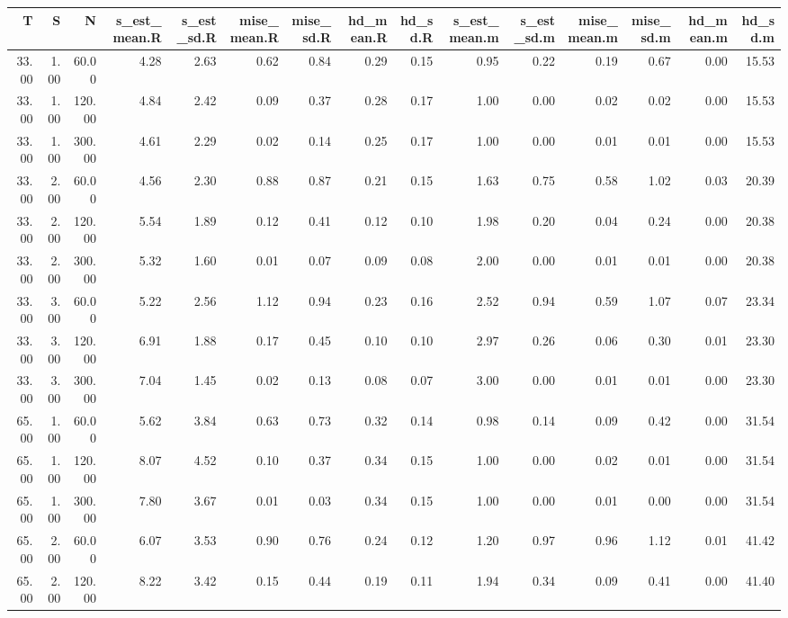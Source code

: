 \begin{table}[ht]
\centering
\begin{tabular}{rrrrrrrrrrrrrrr}
  \hline
T & S & N & s\_est\_mean.R & s\_est\_sd.R & mise\_mean.R & mise\_sd.R & hd\_mean.R & hd\_sd.R & s\_est\_mean.m & s\_est\_sd.m & mise\_mean.m & mise\_sd.m & hd\_mean.m & hd\_sd.m \\ 
  \hline
33.00 & 1.00 & 60.00 & 4.28 & 2.63 & 0.62 & 0.84 & 0.29 & 0.15 & 0.95 & 0.22 & 0.19 & 0.67 & 0.00 & 15.53 \\ 
  33.00 & 1.00 & 120.00 & 4.84 & 2.42 & 0.09 & 0.37 & 0.28 & 0.17 & 1.00 & 0.00 & 0.02 & 0.02 & 0.00 & 15.53 \\ 
  33.00 & 1.00 & 300.00 & 4.61 & 2.29 & 0.02 & 0.14 & 0.25 & 0.17 & 1.00 & 0.00 & 0.01 & 0.01 & 0.00 & 15.53 \\ 
  33.00 & 2.00 & 60.00 & 4.56 & 2.30 & 0.88 & 0.87 & 0.21 & 0.15 & 1.63 & 0.75 & 0.58 & 1.02 & 0.03 & 20.39 \\ 
  33.00 & 2.00 & 120.00 & 5.54 & 1.89 & 0.12 & 0.41 & 0.12 & 0.10 & 1.98 & 0.20 & 0.04 & 0.24 & 0.00 & 20.38 \\ 
  33.00 & 2.00 & 300.00 & 5.32 & 1.60 & 0.01 & 0.07 & 0.09 & 0.08 & 2.00 & 0.00 & 0.01 & 0.01 & 0.00 & 20.38 \\ 
  33.00 & 3.00 & 60.00 & 5.22 & 2.56 & 1.12 & 0.94 & 0.23 & 0.16 & 2.52 & 0.94 & 0.59 & 1.07 & 0.07 & 23.34 \\ 
  33.00 & 3.00 & 120.00 & 6.91 & 1.88 & 0.17 & 0.45 & 0.10 & 0.10 & 2.97 & 0.26 & 0.06 & 0.30 & 0.01 & 23.30 \\ 
  33.00 & 3.00 & 300.00 & 7.04 & 1.45 & 0.02 & 0.13 & 0.08 & 0.07 & 3.00 & 0.00 & 0.01 & 0.01 & 0.00 & 23.30 \\ 
  65.00 & 1.00 & 60.00 & 5.62 & 3.84 & 0.63 & 0.73 & 0.32 & 0.14 & 0.98 & 0.14 & 0.09 & 0.42 & 0.00 & 31.54 \\ 
  65.00 & 1.00 & 120.00 & 8.07 & 4.52 & 0.10 & 0.37 & 0.34 & 0.15 & 1.00 & 0.00 & 0.02 & 0.01 & 0.00 & 31.54 \\ 
  65.00 & 1.00 & 300.00 & 7.80 & 3.67 & 0.01 & 0.03 & 0.34 & 0.15 & 1.00 & 0.00 & 0.01 & 0.00 & 0.00 & 31.54 \\ 
  65.00 & 2.00 & 60.00 & 6.07 & 3.53 & 0.90 & 0.76 & 0.24 & 0.12 & 1.20 & 0.97 & 0.96 & 1.12 & 0.01 & 41.42 \\ 
  65.00 & 2.00 & 120.00 & 8.22 & 3.42 & 0.15 & 0.44 & 0.19 & 0.11 & 1.94 & 0.34 & 0.09 & 0.41 & 0.00 & 41.40 \\ 

\end{tabular}
\end{table}
